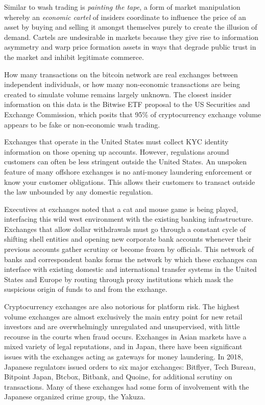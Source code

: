 
Similar to wash trading is \textit{painting the tape}, a form of market manipulation
whereby an \textit{economic cartel} of insiders coordinate to influence the price of an
asset by buying and selling it amongst themselves purely to create the illusion
of demand. Cartels are undesirable in markets because they give rise to
information asymmetry and warp price formation assets in ways that degrade
public trust in the market and inhibit legitimate commerce.


How many transactions on the bitcoin network are real exchanges between
independent individuals, or how many non-economic transactions are being created
to simulate volume remains largely unknown. The closest insider information on
this data is the Bitwise ETF proposal to the US Securities and Exchange
Commission, which posits that 95\% of cryptocurrency exchange volume appears to
be fake or non-economic wash trading. \cite{vigna_most_2019, hougan_economic_2019}

Exchanges that operate in the United States must collect KYC identity
information on those opening up accounts. However, regulations around customers
can often be less stringent outside the United States. An unspoken feature of
many offshore exchanges is no anti-money laundering enforcement or know your
customer obligations. This allows their customers to transact outside the law
unbounded by any domestic regulation. \cite{schar_decentralized_2021}


Executives at exchanges noted that a cat and mouse game is being played,
interfacing this wild west environment with the existing banking infrastructure.
Exchanges that allow dollar withdrawals must go through a constant cycle of
shifting shell entities and opening new corporate bank accounts whenever their
previous accounts gather scrutiny or become frozen by officials. This network of
banks and correspondent banks forms the network by which these exchanges can
interface with existing domestic and international transfer systems in the
United States and Europe by routing through proxy institutions which mask the
suspicious origin of funds to and from the exchange.

Cryptocurrency exchanges are also notorious for platform risk. The highest
volume exchanges are almost exclusively the main entry point for new retail
investors and are overwhelmingly unregulated and unsupervised, with little
recourse in the courts when fraud occurs. Exchanges in Asian markets have a
mixed variety of legal reputations, and in Japan, there have been significant
issues with the exchanges acting as gateways for money laundering. In 2018,
Japanese regulators issued orders to six major exchanges: Bitflyer, Tech Bureau,
Bitpoint Japan, Btcbox, Bitbank, and Quoine, for additional scrutiny on
transactions. Many of these exchanges had some form of involvement with the
Japanese organized crime group, the Yakuza.

